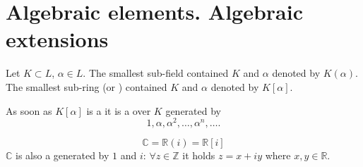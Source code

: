 \section{Algebraic elements. Algebraic extensions}

\begin{definition}
  Let $K \subset L$, $\alpha \in L$. The smallest sub-field contained
  $K$ and $\alpha$ denoted by $K\left(\alpha\right)$. The smallest
  sub-ring (or ) contained $K$ and $\alpha$ denoted by $K\left[\alpha\right]$.
\end{definition}

As soon as $K\left[\alpha\right]$ is a  it is a
 over $K$ generated by
\[
1, \alpha, \alpha^2, \dots,
\alpha^n, \dots.
\]

\begin{example}[$\mathbb{C}$]
  \[
  \mathbb{C} = \mathbb{R}\left(i\right) = \mathbb{R}\left[i\right]
  \]
  $\mathbb{C}$ is also a  generated by $1$
  and $i$: $\forall z \in \mathbb{Z}$ it holds $z = x + i y$ where
  $x,y \in \mathbb{R}$.
\end{example}


